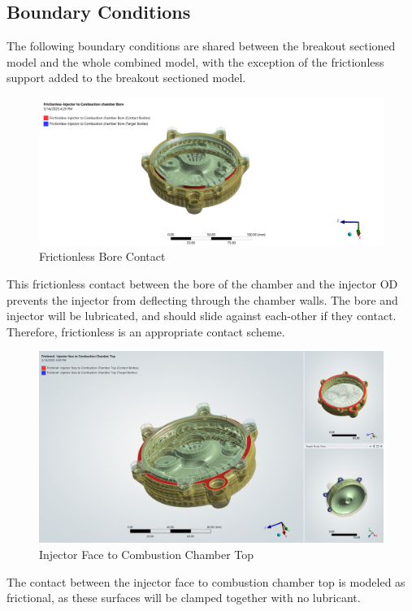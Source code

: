 \subsection{Boundary Conditions}
The following boundary conditions are shared between the breakout sectioned model and the whole combined model, with the exception of the frictionless support added to the breakout sectioned model. 
\begin{figure}
    \centering
    \includegraphics[width=1\linewidth]{Images/Bore Frictionless.png}
    \caption{Frictionless Bore Contact}
    \label{fig:FrictionlessBoreContact}
\end{figure}
This frictionless contact between the bore of the chamber and the injector OD prevents the injector from deflecting through the chamber walls. The bore and injector will be lubricated, and should slide against each-other if they contact. Therefore, frictionless is an appropriate contact scheme. 
\begin{figure}
    \centering
    \includegraphics[width=1\linewidth]{Images/Injector Face to Combustion Chamber Top.png}
    \caption{Injector Face to Combustion Chamber Top}
    \label{fig:Injector Face to Combustion Chamber Top}
\end{figure}
The contact between the injector face to combustion chamber top is modeled as frictional, as these surfaces will be clamped together with no lubricant. 
